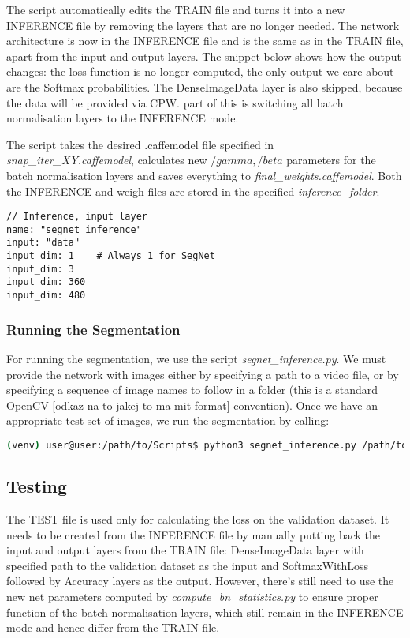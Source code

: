 The script automatically edits the TRAIN file and turns it into a new INFERENCE file by removing the layers that are no longer needed. The network architecture is now in the INFERENCE file and is the same as in the TRAIN file, apart from the input and output layers. The snippet below shows how the output changes: the loss function is no longer computed, the only output we care about are the Softmax probabilities. The DenseImageData layer is also skipped, because the data will be provided via CPW. part of this is switching all batch normalisation layers to the INFERENCE mode.

The script takes the desired .caffemodel file specified in \textit{snap\_iter\_XY.caffemodel}, calculates new $ /gamma, /beta $ parameters for the batch normalisation layers and saves everything to \textit{final\_weights.caffemodel}. Both the INFERENCE and weigh files are stored in the specified \textit{inference\_folder}.

\begin{lstlisting}
// Inference, input layer
name: "segnet_inference"
input: "data"
input_dim: 1	# Always 1 for SegNet
input_dim: 3
input_dim: 360
input_dim: 480
\end{lstlisting}

\subsubsection{Running the Segmentation}

For running the segmentation, we use the script \textit{segnet\_inference.py}. We must provide the network with images either by specifying a path to a video file, or by specifying a sequence of image names to follow in a folder (this is a standard OpenCV [odkaz na to jakej to ma mit format] convention). Once we have an appropriate test set of images, we run the segmentation by calling:

\begin{lstlisting}[language=bash]
(venv) user@user:/path/to/Scripts$ python3 segnet_inference.py /path/to/inference.prototxt /path/to/final_weights.caffemodel /path/to/videofile.avi 
\end{lstlisting}

\subsection{Testing}

The TEST file is used only for calculating the loss on the validation dataset. It needs to be created from the INFERENCE file by manually putting back the input and output layers from the TRAIN file: DenseImageData layer with specified path to the validation dataset as the input and SoftmaxWithLoss followed by Accuracy layers as the output. However, there's still need to use the new net parameters computed by \textit{compute\_bn\_statistics.py} to ensure proper function of the batch normalisation layers, which still remain in the INFERENCE mode and hence differ from the TRAIN file.

